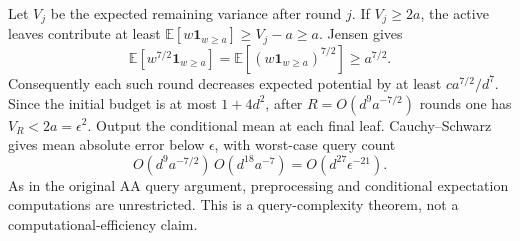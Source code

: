 Let \(V_j\) be the expected remaining variance after round \(j\). If
\(V_j\ge2a\), the active leaves contribute at least
\(\mathbb E[w\mathbf1_{w\ge a}]\ge V_j-a\ge a\). Jensen gives \[
 \mathbb E[w^{7/2}\mathbf1_{w\ge a}]
 =\mathbb E[(w\mathbf1_{w\ge a})^{7/2}]\ge a^{7/2}.
\] Consequently each such round decreases expected potential by at least
\(c a^{7/2}/d^7\). Since the initial budget is at most \(1+4d^2\), after
\(R=O(d^9 a^{-7/2})\) rounds one has \(V_R<2a=\epsilon^2\). Output the
conditional mean at each final leaf. Cauchy--Schwarz gives mean absolute
error below \(\epsilon\), with worst-case query count \[
 O(d^9 a^{-7/2})\,O(d^{18}a^{-7})
 =O(d^{27}\epsilon^{-21}).                              \tag{19}
\] As in the original AA query argument, preprocessing and conditional
expectation computations are unrestricted. This is a query-complexity
theorem, not a computational-efficiency claim.
